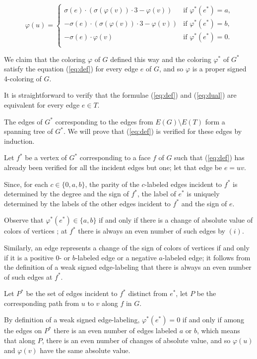 \documentclass[12pt]{article}
\begin{document}
\begin{equation}
	\varphi(u)=
	\begin{cases}
	    \sigma(e)\cdot(\sigma(\varphi(v))\cdot3-\varphi(v)) & \textrm{if $\varphi^*(e^*) = a$,} \\
	    -\sigma(e)\cdot(\sigma(\varphi(v))\cdot3-\varphi(v)) & \textrm{if $\varphi^*(e^*) = b$,} \\
	    -\sigma(e)\cdot\varphi(v) & \textrm{if $\varphi^*(e^*) = 0$.} \\
	\end{cases}
\label{eq:dual}
\end{equation}
    
We claim that the coloring $\varphi$ of $G$ defined this way and the coloring $\varphi^*$ of $G^*$ satisfy the equation (\ref{eq:def}) for every edge $e$ of $G$, and so $\varphi$ is a proper signed 4-coloring of $G$.

It is straightforward to verify that the formulae (\ref{eq:def}) and (\ref{eq:dual}) are equivalent for every edge $e\in T$. 

The edges of $G^*$ corresponding to the edges from $E(G)\setminus E(T)$ form a spanning tree of $G^*$. We will prove that (\ref{eq:def}) is verified for these edges by induction.

Let $f^*$ be a vertex of $G^*$ corresponding to a face $f$ of $G$ such that (\ref{eq:def}) has already been verified for all the incident edges but one; let that edge be $e=uv$. 

Since, for each $c\in\{0,a,b\}$, the parity of the $c$-labeled edges incident to $f^*$ is determined by the degree and the sign of $f^*$, the label of $e^*$ is uniquely determined by the labels of the other edges incident to $f^*$ and the sign of $e$.

Observe that $\varphi^*(e^*)\in\{a,b\}$ if and only if there is a change of absolute value of colors of vertices ; at $f^*$ there is always an even number of such edges by $(i)$.

Similarly, an edge represents a change of the sign of colors of vertices if and only if it is a positive $0$- or $b$-labeled edge or a negative $a$-labeled edge; it follows from the definition of a weak signed edge-labeling that there is always an even number of such edges at $f^*$.

Let $P^*$ be the set of edges incident to $f^*$ distinct from $e^*$, let $P$ be the corresponding path from $u$ to $v$ along $f$ in $G$.

By definition of a weak signed edge-labeling, $\varphi^*(e^*)=0$ if and only if among the edges on $P^*$ there is an even number of edges labeled $a$ or $b$, which means that along $P$, there is an even number of changes of absolute value, and so $\varphi(u)$ and $\varphi(v)$ have the same absolute value.
\end{document}
